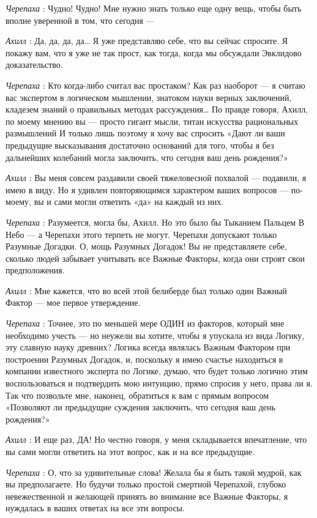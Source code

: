 \documentclass[../main.tex]{subfiles}
\begin{document}
\begin{dialogue}
\emph{Черепаха} : Чудно! Чудно! Мне нужно знать только еще одну вещь, чтобы быть вполне уверенной в том, что сегодня ---

\emph{Ахилл} : Да, да, да, да\ldots{} Я уже представляю себе, что вы сейчас спросите. Я покажу вам, что я уже не так прост, как тогда, когда мы обсуждали Эвклидово доказательство.

\emph{Черепаха} : Кто когда-либо считал вас простаком? Как раз наоборот --- я считаю вас экспертом в логическом мышлении, знатоком науки верных заключений, кладезем знаний о правильных методах рассуждения\ldots{} По правде говоря, Ахилл, по моему мнению вы --- просто гигант мысли, титан искусства рациональных размышлений И только лишь поэтому я хочу вас спросить «Дают ли ваши предыдущие высказывания достаточно оснований для того, чтобы я без дальнейших колебаний могла заключить, что сегодня ваш день рождения?»

\emph{Ахилл} : Вы меня совсем раздавили своей тяжеловесной похвалой --- подавили, я имею в виду. Но я удивлен повторяющимся характером ваших вопросов --- по-моему, вы и сами могли ответить «да» на каждый из них.

\emph{Черепаха} : Разумеется, могла бы, Ахилл. Но это было бы Тыканием Пальцем В Небо --- а Черепахи этого терпеть не могут. Черепахи допускают только Разумные Догадки. О, мощь Разумных Догадок! Вы не представляете себе, сколько людей забывает учитывать все Важные Факторы, когда они строят свои предположения.

\emph{Ахилл} : Мне кажется, что во всей этой белиберде был только один Важный Фактор --- мое первое утверждение.

\emph{Черепаха} : Точнее, это по меньшей мере ОДИН из факторов, который мне необходимо учесть --- но неужели вы хотите, чтобы я упускала из вида Логику, эту славную науку древних? Логика всегда являлась Важным Фактором при построении Разумных Догадок, и, поскольку я имею счастье находиться в компании известного эксперта по Логике, думаю, что будет только логично этим воспользоваться и подтвердить мою интуицию, прямо спросив у него, права ли я. Так что позвольте мне, наконец, обратиться к вам с прямым вопросом «Позволяют ли предыдущие суждения заключить, что сегодня ваш день рождения?»

\emph{Ахилл} : И еще раз, ДА! Но честно говоря, у меня складывается впечатление, что вы сами могли ответить на этот вопрос, как и на все предыдущие.

\emph{Черепаха} : О, что за удивительные слова! Желала бы я быть такой мудрой, как вы предполагаете. Но будучи только простой смертной Черепахой, глубоко невежественной и желающей принять во внимание все Важные Факторы, я нуждалась в ваших ответах на все эти вопросы.


\end{dialogue}
\end{document}
